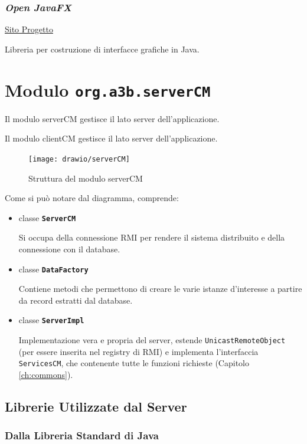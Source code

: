 \subsection{\textsl{Open JavaFX}}

\href{https://openjfx.io/}{Sito Progetto}

Libreria per costruzione di interfacce grafiche in Java.

\chapter{Modulo \texttt{org.a3b.serverCM}}
Il modulo serverCM gestisce il lato server dell'applicazione.
\label{ch:server}

Il modulo clientCM gestisce il lato server dell'applicazione.

\begin{figure}[h]
	\centering
	\caption{Struttura del modulo serverCM}
	\label{fig:severcm}
	\texttt{[image: drawio/serverCM]}
\end{figure}
\pagebreak

Come si può notare dal diagramma, comprende:
\begin{itemize}
	\item classe \textbf{\texttt{ServerCM}}
		
		Si occupa della connessione RMI per rendere il sistema distribuito e della connessione con il database.
	\item classe \textbf{\texttt{DataFactory}}
		
		Contiene metodi che permettono di creare le varie istanze d'interesse a partire da record estratti dal database. 
	\item classe \textbf{\texttt{ServerImpl}}
		
		Implementazione vera e propria del server, estende \texttt{UnicastRemoteObject} (per essere inserita nel registry di RMI) e implementa l'interfaccia \texttt{ServicesCM}, che contenente tutte le funzioni richieste (Capitolo \ref{ch:commons}).
\end{itemize}

\section{Librerie Utilizzate dal Server}

\subsection{Dalla Libreria Standard di Java}

